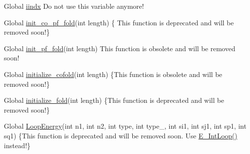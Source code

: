 \begin{DoxyDescription}
\item[Global \hyperlink{fold__vars_8h_a92089ae3a51b5d75a14ce9cc29cc8317}{iindx} ]Do not use this variable anymore! 
\end{DoxyDescription}

\label{deprecated__deprecated000017}
\hypertarget{deprecated__deprecated000017}{}
 
\begin{DoxyDescription}
\item[Global \hyperlink{part__func__co_8h_aa12dda9dd6179cdd22bcce87c0682c07}{init\_\-co\_\-pf\_\-fold}(int length) ]\{ This function is deprecated and will be removed soon!\} 
\end{DoxyDescription}

\label{deprecated__deprecated000011}
\hypertarget{deprecated__deprecated000011}{}
 
\begin{DoxyDescription}
\item[Global \hyperlink{part__func_8h_a15176e23eceeff8c7d14eabcfec8a2af}{init\_\-pf\_\-fold}(int length) ]This function is obsolete and will be removed soon! 
\end{DoxyDescription}

\label{deprecated__deprecated000001}
\hypertarget{deprecated__deprecated000001}{}
 
\begin{DoxyDescription}
\item[Global \hyperlink{cofold_8h_afee0c32208aa2ac97338b6e3fbad7fa5}{initialize\_\-cofold}(int length) ]\{This function is obsolete and will be removed soon!\} 
\end{DoxyDescription}

\label{deprecated__deprecated000004}
\hypertarget{deprecated__deprecated000004}{}
 
\begin{DoxyDescription}
\item[Global \hyperlink{fold_8h_ac3f0a28d9cb609d388b155445073fd20}{initialize\_\-fold}(int length) ]\{This function is deprecated and will be removed soon!\}


\end{DoxyDescription}

\label{deprecated__deprecated000002}
\hypertarget{deprecated__deprecated000002}{}
 
\begin{DoxyDescription}
\item[Global \hyperlink{fold_8h_a2163034a25c6115d894b199e97e03f6c}{LoopEnergy}(int n1, int n2, int type, int type\_\-2, int si1, int sj1, int sp1, int sq1) ]\{This function is deprecated and will be removed soon. Use \hyperlink{loop__energies_8h_a3e5ad89f451254b1fe366d77aa8ff7bd}{E\_\-IntLoop()} instead!\} 
\end{DoxyDescription}

